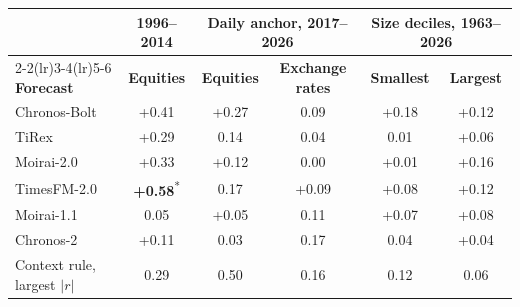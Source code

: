 \begin{tabular}{@{}lccccc@{}}
\toprule
 & \textbf{1996--2014} & \multicolumn{2}{c}{\textbf{Daily anchor, 2017--2026}} & \multicolumn{2}{c}{\textbf{Size deciles, 1963--2026}} \\
\cmidrule(lr){2-2}\cmidrule(lr){3-4}\cmidrule(lr){5-6}
\textbf{Forecast} & \textbf{Equities} & \textbf{Equities} & \textbf{Exchange rates} & \textbf{Smallest} & \textbf{Largest} \\
\midrule
Chronos-Bolt & +0.41 & +0.27 & \textminus{}0.09 & +0.18 & +0.12 \\
TiRex & +0.29 & \textminus{}0.14 & \textminus{}0.04 & \textminus{}0.01 & +0.06 \\
Moirai-2.0 & +0.33 & +0.12 & 0.00 & +0.01 & +0.16 \\
TimesFM-2.0 & \textbf{+0.58}\textsuperscript{*} & \textminus{}0.17 & +0.09 & +0.08 & +0.12 \\
\addlinespace[3pt]
Moirai-1.1 & \textminus{}0.05 & +0.05 & \textminus{}0.11 & +0.07 & +0.08 \\
Chronos-2 & +0.11 & \textminus{}0.03 & \textminus{}0.17 & \textminus{}0.04 & +0.04 \\
\addlinespace[3pt]
Context rule, largest $|r|$ & 0.29 & 0.50 & 0.16 & 0.12 & 0.06 \\
\bottomrule
\end{tabular}
